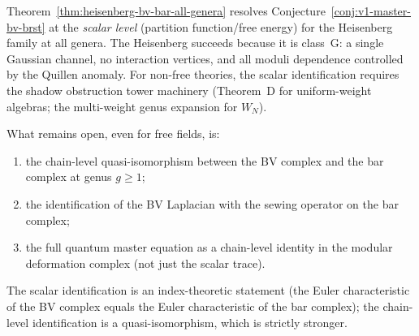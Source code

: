 \begin{remark}
\label{rem:heisenberg-bv-bar-scope}
Theorem~\ref{thm:heisenberg-bv-bar-all-genera} resolves
Conjecture~\ref{conj:v1-master-bv-brst} at the \emph{scalar level}
\textup{(}partition function\slash free energy\textup{)} for the
Heisenberg family at all genera.
The Heisenberg succeeds because it is class~G:
a single Gaussian channel, no interaction vertices, and
all moduli dependence controlled by the Quillen anomaly.
For non-free theories, the scalar identification requires
the shadow obstruction tower machinery
\textup{(}Theorem~D for uniform-weight algebras;
the multi-weight genus expansion for $W_N$\textup{)}.

What remains open, even for
free fields, is:
\begin{enumerate}[label=\textup{(\roman*)},nosep]
\item the chain-level quasi-isomorphism between the BV complex and
 the bar complex at genus $g \geq 1$;
\item the identification of the BV Laplacian with the sewing
 operator on the bar complex;
\item the full quantum master equation as a chain-level identity
 in the modular deformation complex
 \textup{(}not just the scalar trace\textup{)}.
\end{enumerate}
The scalar identification is an index-theoretic statement
(the Euler characteristic of the BV complex equals the Euler
characteristic of the bar complex); the chain-level identification
is a quasi-isomorphism, which is strictly stronger.
\end{remark}

